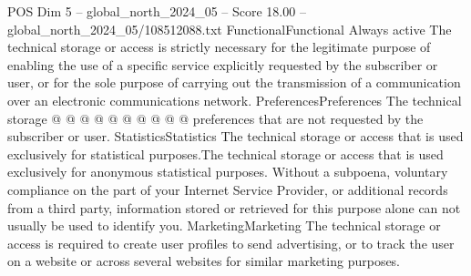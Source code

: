\begin{textsample}{POS Dim 5 – global\_north\_2024\_05 – Score 18.00 – global\_north\_2024\_05/108512088.txt}
FunctionalFunctional Always active The technical storage or access is strictly necessary for the legitimate purpose of enabling the use of a specific service explicitly requested by the subscriber or user, or for the sole purpose of carrying out the transmission of a communication over an electronic communications network.
PreferencesPreferences The technical storage @ @ @ @ @ @ @ @ @ @ preferences that are not requested by the subscriber or user.
StatisticsStatistics The technical storage or access that is used exclusively for statistical purposes.The technical storage or access that is used exclusively for anonymous statistical purposes.
Without a subpoena, voluntary compliance on the part of your Internet Service Provider, or additional records from a third party, information stored or retrieved for this purpose alone can not usually be used to identify you.
MarketingMarketing The technical storage or access is required to create user profiles to send advertising, or to track the user on a website or across several websites for similar marketing purposes.

\end{textsample}
